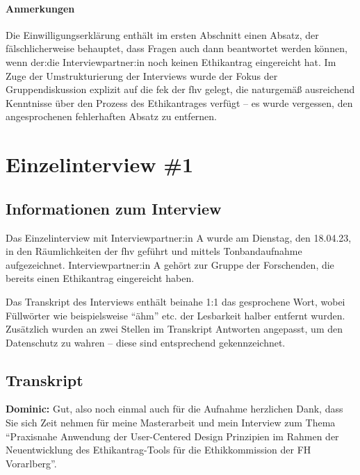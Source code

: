 \documentclass[a4paper,12pt,twoside]{scrreprt}
\begin{document}
\subsubsection*{Anmerkungen}
\label{appendix:anmerkungen-informed-consent-gruppendiskussion}

Die Einwilligungserklärung enthält im ersten Abschnitt einen Absatz, der fälschlicherweise behauptet, dass Fragen auch dann beantwortet werden können, wenn der:die Interviewpartner:in noch keinen Ethikantrag eingereicht hat. Im Zuge der Umstrukturierung der Interviews wurde der Fokus der Gruppendiskussion explizit auf die \acl{fek} der \acl{fhv} gelegt, die naturgemäß ausreichend Kenntnisse über den Prozess des Ethikantrages verfügt -- es wurde vergessen, den angesprochenen fehlerhaften Absatz zu entfernen.



\cleardoublepage
\chapter{Einzelinterview \#1}
\label{appendix:interview-1}

\section{Informationen zum Interview}
\label{appendix:interview-1-infos}

Das Einzelinterview mit Interviewpartner:in A wurde am Dienstag, den 18.04.23, in den Räumlichkeiten der \ac{fhv} geführt und mittels Tonbandaufnahme aufgezeichnet. Interviewpartner:in A gehört zur Gruppe der Forschenden, die bereits einen Ethikantrag eingereicht haben.

Das Transkript des Interviews enthält beinahe 1:1 das gesprochene Wort, wobei Füllwörter wie beispielsweise \enquote{ähm} etc. der Lesbarkeit halber entfernt wurden. Zusätzlich wurden an zwei Stellen im Transkript Antworten angepasst, um den Datenschutz zu wahren -- diese sind entsprechend gekennzeichnet.

\section{Transkript}
\label{appendix:interview-1-transkript}

\textbf{Dominic:} Gut, also noch einmal auch für die Aufnahme herzlichen Dank, dass Sie sich Zeit nehmen für meine Masterarbeit und mein Interview zum Thema \enquote{Praxisnahe Anwendung der User-Centered Design Prinzipien im Rahmen der Neuentwicklung des Ethikantrag-Tools für die Ethikkommission der FH Vorarlberg}.
\end{document}
